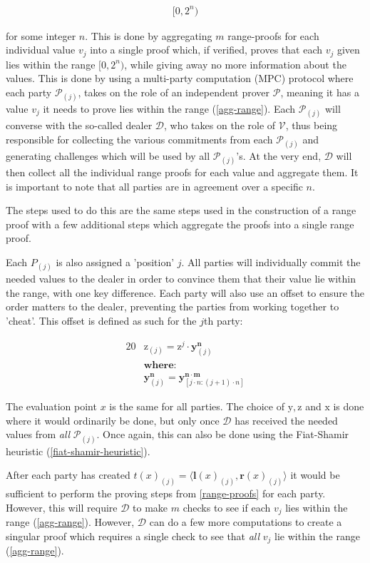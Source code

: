 \documentclass{article}
\newcommand{\eq}[1]{\begin{alignat*}{20}#1\end{alignat*}}
\newcommand{\eqn}[2]{\begin{equation}\label{#1}\begin{split}#2\end{split}\end{equation}}
\renewcommand{\vec}[1]{\boldsymbol{#1}}
\newcommand{\ran}[1]{\mathrm{#1}}
\newcommand{\vecran}[1]{\mathbf{#1}}
\newcommand{\V}{\mathcal{V}}
\renewcommand{\P}{\mathcal{P}}
\newcommand{\D}{\mathcal{D}}
\newcommand{\dotp}[2]{\langle #1, #2 \rangle}
\begin{document}
\eqn{agg-range}{
	[0,2^n)
}

for some integer $n$. This is done by aggregating $m$ range-proofs for
each individual value $v_j$ into a single proof which, if verified,
proves that each $v_j$ given lies within the range $[0,2^n)$, while
giving away no more information about the values. This is done by using
a multi-party computation (MPC) protocol where each party $\P_{(j)}$,
takes on the role of an independent prover $\P$, meaning it has a value
$v_j$ it needs to prove lies within the range (\ref{agg-range}). Each
$\P_{(j)}$ will converse with the so-called dealer $\D$, who takes on
the role of $\V$, thus being responsible for collecting the various
commitments from each $\P_{(j)}$ and generating challenges which will
be used by all $\P_{(j)}$'s. At the very end, $\D$ will then collect
all the individual range proofs for each value and aggregate them. It is
important to note that all parties are in agreement over a specific $n$.

The steps used to do this are the same steps used in the construction
of a range proof with a few additional steps which aggregate the proofs
into a single range proof.

Each $P_{(j)}$ is also assigned a 'position' $j$. All parties will
individually commit the needed values to the dealer in order to
convince them that their value lie within the range, with one key
difference. Each party will also use an offset to ensure the order 
matters to the dealer, preventing the parties from working together 
to 'cheat'. This offset is defined as such for the $j$th party:

\eq{
	&\ran{z}_{(j)}   = \ran{z}^j \cdot \vecran{y}^{\vec{n}}_{(j)} \\
	&\textbf{where:}\\
	&\vecran{y}^{\vec{n}}_{(j)} = \vecran{y}^{\vec{n \cdot m}}_{[j \cdot n:(j+1) \cdot n]}
}

The evaluation point $x$ is the same for all parties. The choice
of $\ran{y}, \ran{z}$ and $\ran{x}$ is done where it would ordinarily
be done, but only once $\D$ has received the needed values from \textit{all}
$\P_{(j)}$. Once again, this can also be done using the Fiat-Shamir
heuristic (\ref{fiat-shamir-heuristic}).

After each party has created $t(x)_{(j)} =
\dotp{\vec{l}(x)_{(j)}}{\vec{r}(x)_{(j)}}$ it would be sufficient
to perform the proving steps from \ref{range-proofs} for each
party. However, this will require $\D$ to make $m$ checks to see if
each $v_j$ lies within the range (\ref{agg-range}). However, $\D$ can
do a few more computations to create a singular proof which requires
a single check to see that \textit{all} $v_j$ lie within the range
(\ref{agg-range}).
\end{document}
